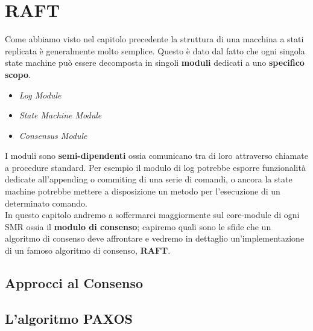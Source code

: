 \chapter{RAFT}
	Come abbiamo visto nel capitolo precedente la struttura di una macchina a stati replicata è generalmente molto semplice. Questo è dato dal fatto che ogni singola state machine può essere decomposta in singoli \textbf{moduli} dedicati a uno \textbf{specifico scopo}.
	\begin{itemize}
		\item{\textit{Log Module}}
		\item{\textit{State Machine Module}}
		\item{\textit{Consensus Module}}
	\end{itemize}
	I moduli sono \textbf{semi-dipendenti} ossia comunicano tra di loro attraverso chiamate a procedure standard. Per esempio il modulo di log potrebbe esporre funzionalità dedicate all'appending o commiting di una serie di comandi, o ancora la state machine potrebbe mettere a disposizione un metodo per l'esecuzione di un determinato comando.\\
	In questo capitolo andremo a soffermarci maggiormente sul core-module di ogni SMR ossia il \textbf{modulo di consenso}; capiremo quali sono le sfide che un algoritmo di consenso deve affrontare e vedremo in dettaglio un'implementazione di un famoso algoritmo di consenso, \textbf{RAFT}.

	\section{Approcci al Consenso}
    
  \section{L'algoritmo PAXOS}
    
